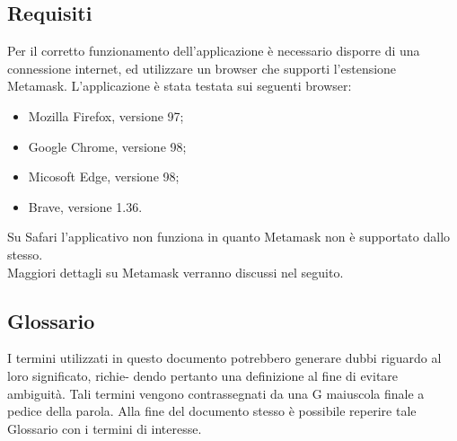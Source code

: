 \subsection{Requisiti}
Per il corretto funzionamento dell'applicazione è necessario disporre di una connessione internet, ed utilizzare un browser che supporti l'estensione Metamask.
L'applicazione è stata testata sui seguenti browser:
\begin{itemize}
    \item Mozilla Firefox, versione 97;
    \item Google Chrome, versione 98;
    \item Micosoft Edge, versione 98;
    \item Brave, versione 1.36.
\end{itemize}
Su Safari l'applicativo non funziona in quanto Metamask non è supportato dallo stesso.\\
Maggiori dettagli su Metamask verranno discussi nel seguito.

\subsection{Glossario}
I termini utilizzati in questo documento potrebbero generare dubbi riguardo al loro significato, richie-
dendo pertanto una definizione al fine di evitare ambiguità. Tali termini vengono contrassegnati da
una G maiuscola finale a pedice della parola. Alla fine del documento stesso è possibile reperire tale Glossario con i termini di interesse.


